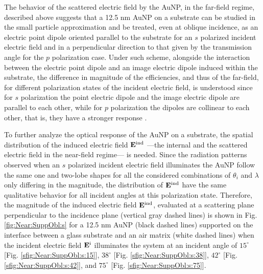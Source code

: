 {The behavior of the scattered electric field by the AuNP, in the far-field regime, described above suggests that a 12.5 nm AuNP on a substrate can be studied in the small particle approximation and be treated, even at oblique incidence, as an electric point dipole oriented  parallel to the substrate for an $s$ polarized incident electric field and in a perpendicular direction to that given by the transmission angle for the $p$ polarization case. Under such scheme, alongside the interaction between the electric point dipole and an image electric dipole induced within the substrate, the difference in magnitude of the efficiencies, and thus of the far-field, for different polarization states of the incident electric field,  is understood since for $s$ polarization the point electric dipole and the image electric dipole are parallel to each other, while for  $p$ polarization the dipoles are collinear to each other, that is, they have a stronger response \cite{griffiths2013electrodynamics}.

To further analyze the optical response of the AuNP on a substrate, the spatial distribution of the induced electric field $\vb{E}^\text{ind}$ ---the internal and the scattered electric field in the near-field regime--- is needed. Since the radiation patterns observed when an $s$ polarized incident electric field illuminates the AuNP follow the same one and two-lobe shapes for all the considered combinations of $\theta_i$ and $\lambda$ only differing in the magnitude, the distribution of $\vb{E}^\text{ind}$  have the same qualitative behavior for all incident angles at this polarization state. Therefore, the magnitude of the induced electric field $\vb{E}^\text{ind}$, evaluated at a scattering plane perpendicular to the incidence plane (vertical gray dashed lines) is shown in Fig. \ref{fig:Near:SuppObl:s} for a 12.5 nm AuNP (black dashed lines) supported on the interface between a glass substrate and an air matrix (white dashed lines) when the incident electric field $\vb{E}^\text{i}$ illuminates the system at an incident angle of $15^\circ$ [Fig. \ref{sfig:Near:SuppObl:s:15}], $38^\circ$ [Fig. \ref{sfig:Near:SuppObl:s:38}], $42^\circ$ [Fig. \ref{sfig:Near:SuppObl:s:42}],  and $75^\circ$ [Fig. \ref{sfig:Near:SuppObl:s:75}].

}
